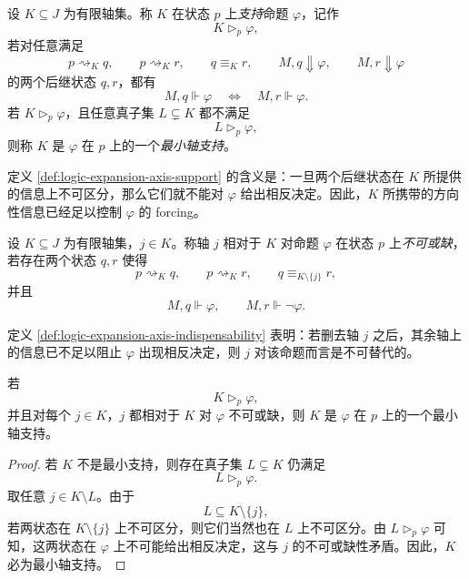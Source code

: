 \begin{definition}[轴支持与最小轴支持]\label{def:logic-expansion-axis-support}
设 \(K\subseteq J\) 为有限轴集。称 \(K\) 在状态 \(p\) 上\emph{支持}命题 \(\varphi\)，记作
\[
K\triangleright_p \varphi,
\]
若对任意满足
\[
p\rightsquigarrow_K q,
\qquad
p\rightsquigarrow_K r,
\qquad
q\equiv_K r,
\qquad
M,q\Downarrow \varphi,
\qquad
M,r\Downarrow \varphi
\]
的两个后继状态 \(q,r\)，都有
\[
M,q\Vdash \varphi
\quad\Longleftrightarrow\quad
M,r\Vdash \varphi.
\]
若 \(K\triangleright_p \varphi\)，且任意真子集 \(L\subsetneq K\) 都不满足
\[
L\triangleright_p \varphi,
\]
则称 \(K\) 是 \(\varphi\) 在 \(p\) 上的一个\emph{最小轴支持}。
\end{definition}

定义 \ref{def:logic-expansion-axis-support} 的含义是：一旦两个后继状态在 \(K\) 所提供的信息上不可区分，那么它们就不能对 \(\varphi\) 给出相反决定。因此，\(K\) 所携带的方向性信息已经足以控制 \(\varphi\) 的 forcing。

\begin{definition}[相对不可或缺性]\label{def:logic-expansion-axis-indispensability}
设 \(K\subseteq J\) 为有限轴集，\(j\in K\)。称轴 \(j\) 相对于 \(K\) 对命题 \(\varphi\) 在状态 \(p\) 上\emph{不可或缺}，若存在两个状态 \(q,r\) 使得
\[
p\rightsquigarrow_K q,
\qquad
p\rightsquigarrow_K r,
\qquad
q\equiv_{K\setminus\{j\}} r,
\]
并且
\[
M,q\Vdash \varphi,
\qquad
M,r\Vdash \neg\varphi.
\]
\end{definition}

定义 \ref{def:logic-expansion-axis-indispensability} 表明：若删去轴 \(j\) 之后，其余轴上的信息已不足以阻止 \(\varphi\) 出现相反决定，则 \(j\) 对该命题而言是不可替代的。

\begin{proposition}[不可或缺性推出最小性]\label{prop:logic-expansion-indispensability-implies-minimality}
若
\[
K\triangleright_p \varphi,
\]
并且对每个 \(j\in K\)，\(j\) 都相对于 \(K\) 对 \(\varphi\) 不可或缺，则 \(K\) 是 \(\varphi\) 在 \(p\) 上的一个最小轴支持。
\end{proposition}

\begin{proof}
若 \(K\) 不是最小支持，则存在真子集 \(L\subsetneq K\) 仍满足
\[
L\triangleright_p \varphi.
\]
取任意 \(j\in K\setminus L\)。由于
\[
L\subseteq K\setminus\{j\},
\]
若两状态在 \(K\setminus\{j\}\) 上不可区分，则它们当然也在 \(L\) 上不可区分。由 \(L\triangleright_p \varphi\) 可知，这两状态在 \(\varphi\) 上不可能给出相反决定，这与 \(j\) 的不可或缺性矛盾。因此，\(K\) 必为最小轴支持。
\end{proof}

